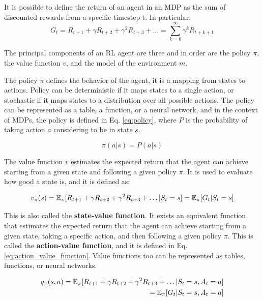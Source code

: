 It is possible to define the return of an agent in an MDP as the sum of discounted rewards from a specific timestep t.
In particular:
\begin{equation} \label{eq:return}
    G_t = R_{t+1} + \gamma R_{t+2} + \gamma^2 R_{t+3} + \dots = \sum_{k=0}^{\infty} \gamma^k R_{t+k+1}
\end{equation}

The principal components of an RL agent are three and in order are the policy $\pi$, the value function $v$, and the model of the environment $m$.

The policy $\pi$ defines the behavior of the agent, it is a mapping from states to actions.
Policy can be deterministic if it maps states to a single action, or stochastic if it maps states to a distribution over all possible actions.
The policy can be represented as a table, a function, or a neural network, and in the context of MDPs, the policy is defined in Eq. \ref{eq:policy}, where $P$ is the probability of taking action $a$ considering to be in state $s$.

\begin{equation} \label{eq:policy}
    \pi(a|s) = P(a|s)
\end{equation}



The value function $v$ estimates the expected return that the agent can achieve starting from a given state and following a given policy $\pi$.
It is used to evaluate how good a state is, and it is defined as:

\begin{equation} \label{eq:value_function}
    v_{\pi}(s) = \operatorname{\mathbb{E}}_{\pi}[R_{t+1} + \gamma R_{t+2} + \gamma^2 R_{t+3} + \dots | S_t = s] = \operatorname{\mathbb{E}}_{\pi}[G_t | S_t = s]
\end{equation}

This is also called the \textbf{state-value function}.
It exists an equivalent function that estimates the expected return that the agent can achieve starting from a given state, taking a specific action, and then following a given policy $\pi$.
This is called the \textbf{action-value function}, and it is defined in Eq. \ref{eq:action_value_function}.
Value functions too can be represented as tables, functions, or neural networks.

\begin{equation} \label{eq:action_value_function}
\begin{split}
    q_{\pi}(s, a) = \operatorname{\mathbb{E}}_{\pi}[R_{t+1} + \gamma R_{t+2} + \gamma^2 R_{t+3} + \dots | S_t = s, A_t = a] \\
    = \operatorname{\mathbb{E}}_{\pi}[G_t | S_t = s, A_t = a]
\end{split}
\end{equation}


